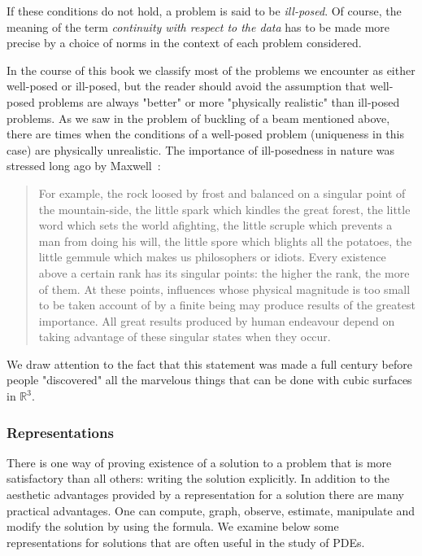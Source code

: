 If these conditions do not hold, a problem is said to be \emph{ill-posed}. Of course, the meaning of the term \emph{continuity with respect to the data} has to be made more precise by a choice of norms in the context of each problem considered.

In the course of this book we classify most of the problems we encounter as either well-posed or ill-posed, but the reader should avoid the assumption that well-posed problems are always "better" or more "physically realistic" than ill-posed problems. As we saw in the problem of buckling of a beam mentioned above, there are times when the conditions of a well-posed problem (uniqueness in this case) are physically unrealistic. The importance of ill-posedness in nature was stressed long ago by Maxwell~\cite{Max}:

\begin{quote}
For example, the rock loosed by frost and balanced on a singular point of the mountain-side, the little spark which kindles the great forest, the little word which sets the world afighting, the little scruple which prevents a man from doing his will, the little spore which blights all the potatoes, the little gemmule which makes us philosophers or idiots. Every existence above a certain rank has its singular points: the higher the rank, the more of them. At these points, influences whose physical magnitude is too small to be taken account of by a finite being may produce results of the greatest importance. All great results produced by human endeavour depend on taking advantage of these singular states when they occur.
\end{quote}

We draw attention to the fact that this statement was made a full century before people "discovered" all the marvelous things that can be done with cubic surfaces in $\mathbb{R}^3$.

\subsubsection{Representations}\label{subsec:representations}

There is one way of proving existence of a solution to a problem that is more satisfactory than all others: writing the solution explicitly. In addition to the aesthetic advantages provided by a representation for a solution there are many practical advantages. One can compute, graph, observe, estimate, manipulate and modify the solution by using the formula. We examine below some representations for solutions that are often useful in the study of PDEs.

